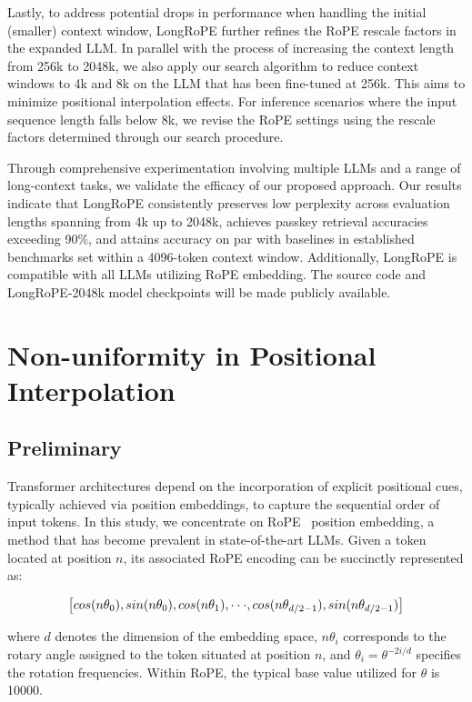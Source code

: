 Lastly, to address potential drops in performance when handling the initial (smaller) context window, {LongRoPE} further refines the RoPE rescale factors in the expanded LLM. In parallel with the process of increasing the context length from 256k to 2048k, we also apply our search algorithm to reduce context windows to 4k and 8k on the LLM that has been fine-tuned at 256k. This aims to minimize positional interpolation effects. For inference scenarios where the input sequence length falls below 8k, we revise the RoPE settings using the rescale factors determined through our search procedure.

Through comprehensive experimentation involving multiple LLMs and a range of long-context tasks, we validate the efficacy of our proposed approach. Our results indicate that LongRoPE consistently preserves low perplexity across evaluation lengths spanning from 4k up to 2048k, achieves passkey retrieval accuracies exceeding 90\%, and attains accuracy on par with baselines in established benchmarks set within a 4096-token context window. Additionally, LongRoPE is compatible with all LLMs utilizing RoPE embedding. The source code and LongRoPE-2048k model checkpoints will be made publicly available.

\section{Non-uniformity in Positional Interpolation}
\label{sec:analysis}

\subsection{Preliminary}

Transformer architectures depend on the incorporation of explicit positional cues, typically achieved via position embeddings, to capture the sequential order of input tokens. In this study, we concentrate on RoPE~\cite{rope} position embedding, a method that has become prevalent in state-of-the-art LLMs. Given a token located at position $n$, its associated RoPE encoding can be succinctly represented as:

\begin{equation}
		\fontsize{7.8}{7.8} \selectfont
	\label{eq:rope}
	\left[ cos(n\theta_0), sin(n\theta_0), cos(n\theta_1), \cdot\cdot\cdot, cos(n\theta_{d/2-1}), sin(n\theta_{d/2-1}) \right]   
\end{equation}

where $d$ denotes the dimension of the embedding space, 
$n\theta_i$ corresponds to the rotary angle assigned to the token situated at position $n$, 
and $\theta_i=\theta^{-2i/d}$ specifies the rotation frequencies. Within RoPE, the typical base value utilized for $\theta$ is 10000.

